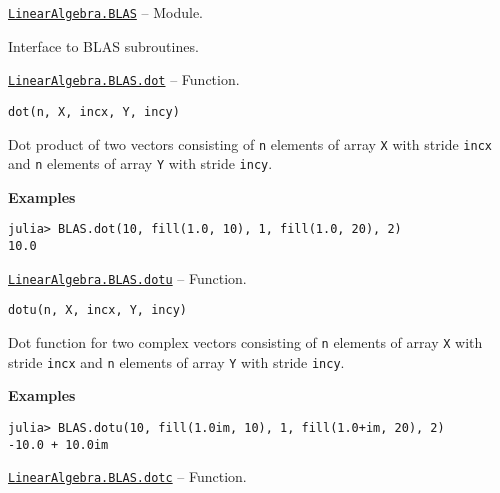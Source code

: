 \hypertarget{16764328874035557229}{} 
\hyperlink{16764328874035557229}{\texttt{LinearAlgebra.BLAS}}  -- {Module.}

\begin{adjustwidth}{2em}{0pt}

Interface to BLAS subroutines.



\end{adjustwidth}
\hypertarget{18272264626945379268}{} 
\hyperlink{18272264626945379268}{\texttt{LinearAlgebra.BLAS.dot}}  -- {Function.}

\begin{adjustwidth}{2em}{0pt}


\begin{verbatim}
dot(n, X, incx, Y, incy)
\end{verbatim}

Dot product of two vectors consisting of \texttt{n} elements of array \texttt{X} with stride \texttt{incx} and \texttt{n} elements of array \texttt{Y} with stride \texttt{incy}.

\textbf{Examples}


\begin{verbatim}
julia> BLAS.dot(10, fill(1.0, 10), 1, fill(1.0, 20), 2)
10.0
\end{verbatim}



\end{adjustwidth}
\hypertarget{17189447686500977816}{} 
\hyperlink{17189447686500977816}{\texttt{LinearAlgebra.BLAS.dotu}}  -- {Function.}

\begin{adjustwidth}{2em}{0pt}


\begin{verbatim}
dotu(n, X, incx, Y, incy)
\end{verbatim}

Dot function for two complex vectors consisting of \texttt{n} elements of array \texttt{X} with stride \texttt{incx} and \texttt{n} elements of array \texttt{Y} with stride \texttt{incy}.

\textbf{Examples}


\begin{verbatim}
julia> BLAS.dotu(10, fill(1.0im, 10), 1, fill(1.0+im, 20), 2)
-10.0 + 10.0im
\end{verbatim}



\end{adjustwidth}
\hypertarget{14215820815183043302}{} 
\hyperlink{14215820815183043302}{\texttt{LinearAlgebra.BLAS.dotc}}  -- {Function.}

